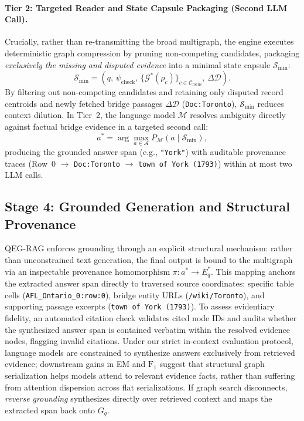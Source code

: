 \documentclass[runningheads]{llncs}
\begin{document}
\paragraph{Tier 2: Targeted Reader and State Capsule Packaging (Second LLM Call).}
Crucially, rather than re-transmitting the broad multigraph, the engine executes deterministic graph compression by pruning non-competing candidates, packaging \emph{exclusively the missing and disputed evidence} into a minimal state capsule $\mathcal{S}_{\min}$:
\begin{equation}
\label{eq:l2-capsule}
\mathcal{S}_{\min} = \left( q, \, \psi_{\text{check}}, \, \{ \mathcal{G}^*(\rho_c) \}_{c \in \mathcal{C}_{\text{focus}}}, \, \Delta \mathcal{D} \right).
\end{equation}
By filtering out non-competing candidates and retaining only disputed record centroids and newly fetched bridge passages $\Delta \mathcal{D}$ (\texttt{Doc:Toronto}), $\mathcal{S}_{\min}$ reduces context dilution. In Tier~2, the language model $\mathcal{M}$ resolves ambiguity directly against factual bridge evidence in a targeted second call:
\begin{equation}
a^* = \arg\max_{a \in \mathcal{A}} P_{\mathcal{M}}(a \mid \mathcal{S}_{\min}),
\end{equation}
producing the grounded answer span (e.g., \texttt{"York"}) with auditable provenance traces (Row~0 $\to$ \texttt{Doc:Toronto} $\to$ \texttt{town of York (1793)}) within at most two LLM calls.

\subsection{Stage 4: Grounded Generation and Structural Provenance}
\label{sec:method-answer}
QEG-RAG enforces grounding through an explicit structural mechanism: rather than unconstrained text generation, the final output is bound to the multigraph via an inspectable provenance homomorphism $\pi: a^* \rightarrow E_q^*$. This mapping anchors the extracted answer span directly to traversed source coordinates: specific table cells (\texttt{AFL\_Ontario\_0:row:0}), bridge entity URLs (\texttt{/wiki/Toronto}), and supporting passage excerpts (\texttt{town of York (1793)}). To assess evidentiary fidelity, an automated citation check validates cited node IDs and audits whether the synthesized answer span is contained verbatim within the resolved evidence nodes, flagging invalid citations. Under our strict in-context evaluation protocol, language models are constrained to synthesize answers exclusively from retrieved evidence; downstream gains in EM and $\text{F}_1$ suggest that structural graph serialization helps models attend to relevant evidence facts, rather than suffering from attention dispersion across flat serializations. If graph search disconnects, \emph{reverse grounding} synthesizes directly over retrieved context and maps the extracted span back onto $G_q$.
\end{document}
